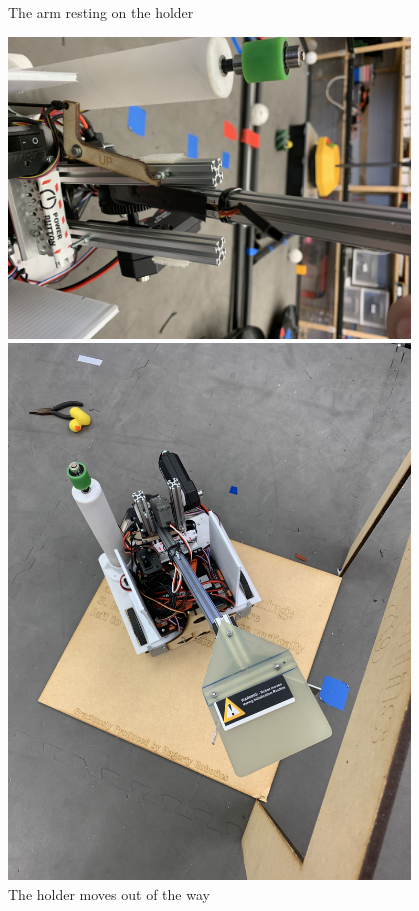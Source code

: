 \begin{figure}[ht]
\begin{minipage}[b]{.48\textwidth}
  \caption{The arm resting on the holder}
  \label{fig:110821_2}
\end{minipage}
\end{figure}

\begin{figure}[ht]
\centering
\begin{minipage}[b]{.48\textwidth}
  \centering
  \includegraphics[width=0.95\textwidth]{Meetings/November/11-08-21/11-8-21_Hardware_Figure3 - Nathan Forrer.JPG}
  \caption{The holder moves out of the way}
  \label{fig:110821_3}
\end{minipage}%
\hfill%
\begin{minipage}[b]{.48\textwidth}
  \centering
  \includegraphics[width=0.95\textwidth]{Meetings/November/11-08-21/11-8-21_Hardware_Figure4 - Nathan Forrer.JPG}

\end{minipage}
\end{figure}
